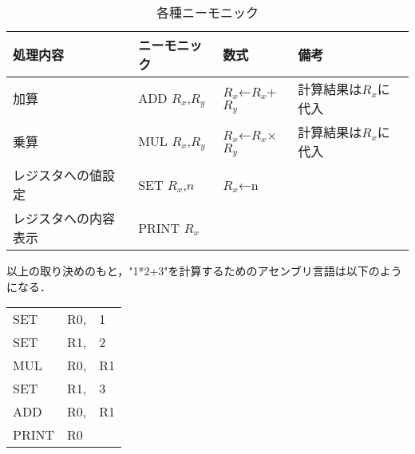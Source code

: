 \documentclass[a4j]{jsarticle}  %
\begin{document}
\begin{table}[htb]
  \begin{center}
    \caption{各種ニーモニック}
\begin{tabular}{l|l|l|l} \hline
処理内容 & ニーモニック & 数式 & 備考 \\ \hline
加算 & ADD $R_x$,$R_y$ & $R_x$←$R_x$+$R_y$ & 計算結果は$R_x$に代入 \\
乗算 & MUL $R_x$,$R_y$ & $R_x$←$R_x$×$R_y$ & 計算結果は$R_x$に代入 \\
レジスタへの値設定 & SET $R_x$,$n$ & $R_x$←n & \\
レジスタへの内容表示 & PRINT $R_x$ & & \\ \hline
\end{tabular} 
\end{center}
\end{table}
以上の取り決めのもと，"1*2+3"を計算するためのアセンブリ言語は以下のようになる．

\begin{table}[htb]
\begin{tabular}{lll}
SET & R0, & 1 \\
SET & R1, & 2 \\
MUL & R0, & R1 \\
SET & R1, & 3 \\
ADD & R0, & R1 \\
PRINT & R0 & \\
\end{tabular}
\end{table}
\end{document}
